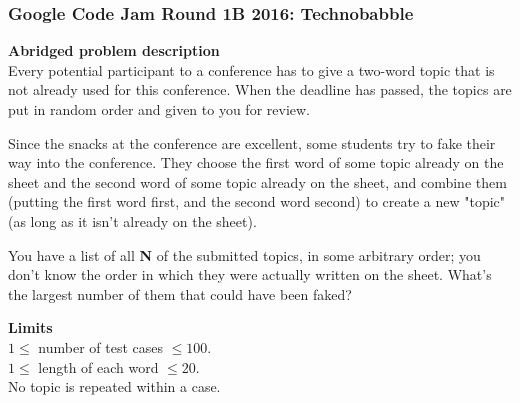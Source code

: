 \documentclass{beamer}
\begin{document}
\begin{frame}%
\frametitle{Google Code Jam Round 1B 2016: Technobabble}


\scriptsize

\textbf{Abridged problem description}\\
\vspace{0.1cm}
Every potential participant to a conference has to give a two-word topic that
is not already used for this conference. When the deadline has passed, the topics
are put in random order and given to you for review.\\

\vspace{0.15cm}

Since the snacks at the conference are excellent, some students try to
fake their way into the conference. They choose the first word of some topic already
on the sheet and the second word of some topic already on the sheet, and combine them (putting the first word first, and the second word second)
to create a new "topic" (as long as it isn't already on the sheet).\\

\vspace{0.15cm}

You have a list of all \textbf{N} of the submitted topics, in
some arbitrary order; you don't know the order in which they were actually written on the sheet.
What's the largest number of them that could have been faked?

\vspace{0.3cm}


\textbf{Limits}\\
\vspace{0.1cm}
$1 \le$ number of test cases $\le 100$.\\
$1 \le$ length of each word $\le 20$.\\
No topic is repeated within a case.

\end{frame}
\end{document}
